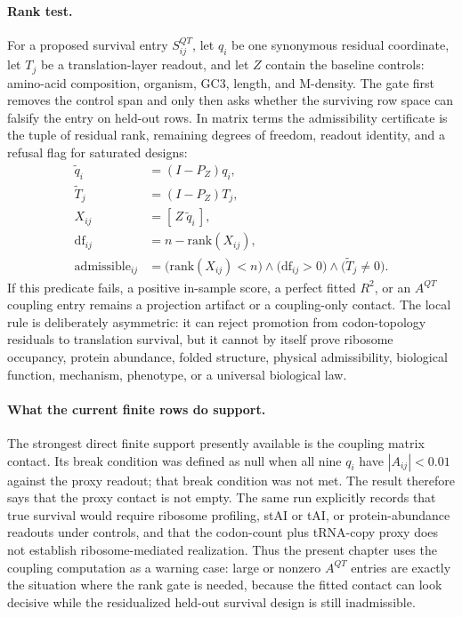 \paragraph{Rank test.}
For a proposed survival entry $S^{QT}_{ij}$, let $q_i$ be one synonymous residual coordinate, let $T_j$ be a translation-layer readout, and let $Z$ contain the baseline controls: amino-acid composition, organism, GC3, length, and M-density.  The gate first removes the control span and only then asks whether the surviving row space can falsify the entry on held-out rows.  In matrix terms the admissibility certificate is the tuple of residual rank, remaining degrees of freedom, readout identity, and a refusal flag for saturated designs:
$$
\begin{aligned}
\widetilde q_i &= (I-P_Z)q_i,\\
\widetilde T_j &= (I-P_Z)T_j,\\
X_{ij} &= [\,Z\ \widetilde q_i\,],\\
\mathrm{df}_{ij} &= n-\mathrm{rank}(X_{ij}),\\
\mathrm{admissible}_{ij} &= \bigl(\mathrm{rank}(X_{ij})<n\bigr)\wedge \bigl(\mathrm{df}_{ij}>0\bigr)\wedge \bigl(\widetilde T_j\neq 0\bigr).
\end{aligned}
$$
If this predicate fails, a positive in-sample score, a perfect fitted $R^2$, or an $A^{QT}$ coupling entry remains a projection artifact or a coupling-only contact.  The local rule is deliberately asymmetric: it can reject promotion from codon-topology residuals to translation survival, but it cannot by itself prove ribosome occupancy, protein abundance, folded structure, physical admissibility, biological function, mechanism, phenotype, or a universal biological law.

\paragraph{What the current finite rows do support.}
The strongest direct finite support presently available is the coupling matrix contact.  Its break condition was defined as null when all nine $q_i$ have $|A_{ij}|<0.01$ against the proxy readout; that break condition was not met.  The result therefore says that the proxy contact is not empty.  The same run explicitly records that true survival would require ribosome profiling, stAI or tAI, or protein-abundance readouts under controls, and that the codon-count plus tRNA-copy proxy does not establish ribosome-mediated realization.  Thus the present chapter uses the coupling computation as a warning case: large or nonzero $A^{QT}$ entries are exactly the situation where the rank gate is needed, because the fitted contact can look decisive while the residualized held-out survival design is still inadmissible.

